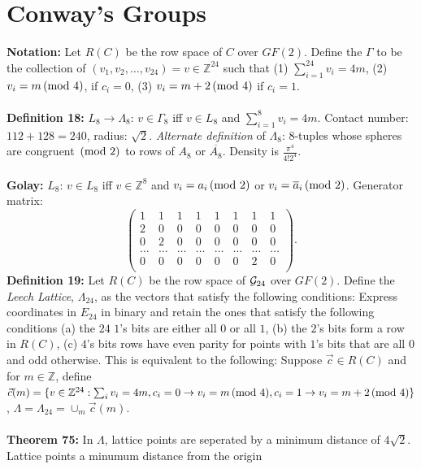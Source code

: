 \section{Conway's Groups}
{\bf Notation:}  Let $R(C)$ be the row space of $C$ over $GF(2)$.  Define the $\Gamma$ to
be the collection of $(v_1, v_2, \ldots , v_{24})=v \in {\mathbb Z}^{24}$ such that
(1) $\sum_{i=1}^{24} v_i = 4m$, (2) $v_i = m \thinspace \textnormal{(mod } 4 \textnormal{)}$, 
if $c_i = 0$, (3) $v_i=m+2 \thinspace \textnormal{(mod } 4 \textnormal{)}$ if $c_i = 1$.
\\
\\
{\bf Definition 18:}
$L_8 \rightarrow \Lambda_8$:  $v \in \Gamma_8$ iff
$v \in L_8$ and $\sum_{i=1}^{8} v_i = 4m$.  Contact number: $112+128=240$, radius: ${\sqrt 2}$.
\emph{Alternate definition} of $\Lambda_8$: $8$-tuples whose spheres are congruent $\thinspace \textnormal{(mod } 2 \textnormal{)}$ to
rows of $A_8$ or ${\overline {A_8}}$.
Density is ${\frac {\pi^4}{4!2^4}}$.
\\
\\
{\bf Golay:}
$L_8$:  $v \in L_8$ iff $v \in {\mathbb Z}^8$ and $v_i = a_i \thinspace \textnormal{(mod } 2 \textnormal{)}$ or
$v_i = {\overline a_i} \thinspace \textnormal{(mod } 2 \textnormal{)}$.  Generator matrix:
$$\left(
\begin{array}{cccccccc}
1 & 1 & 1 & 1 & 1 & 1 & 1 & 1 \\
2 & 0 & 0 & 0 & 0 & 0 & 0 & 0 \\
0 & 2 & 0 & 0 & 0 & 0 & 0 & 0 \\
\ldots & \ldots & \ldots & \ldots & \ldots & \ldots & \ldots & \ldots \\
0 & 0 & 0 & 0 & 0 & 0 & 2 & 0 \\
\end{array}
\right).$$
{\bf Definition 19:}
Let $R(C)$ be the row space of ${\cal G}_{24}$ over $GF(2)$.  
Define the \emph{Leech Lattice}, $\Lambda_{24}$,
as the vectors that satisfy the following conditions:
Express coordinates in $E_{24}$ in binary and retain the ones that satisfy
the following conditions (a) the $24$ $1$'s bits are either all $0$ or all $1$, (b)
the $2$'s bits form a row in $R(C)$, (c) $4$'s bits rows have even parity for points
with $1$'s bits that are all $0$ and odd otherwise. This is equivalent to the following:
Suppose ${\vec c} \in R(C)$ and for $m \in {\mathbb Z}$, define
${\vec c}(m)= \{  
v \in {\mathbb Z}^{24}:  \sum_i v_i = 4m, 
c_i = 0 \rightarrow v_i = m \thinspace \textnormal{(mod } 4 \textnormal{)},
c_i = 1 \rightarrow v_i = m+2 \thinspace \textnormal{(mod } 4 \textnormal{)}
\}$,
$\Lambda = \Lambda_{24}= \cup_m {\vec c}(m)$.
\\
\\
{\bf Theorem 75:}   In $\Lambda$, lattice points are seperated by a minimum
distance of $4 {\sqrt 2}$.  Lattice points a minumum distance from the origin
